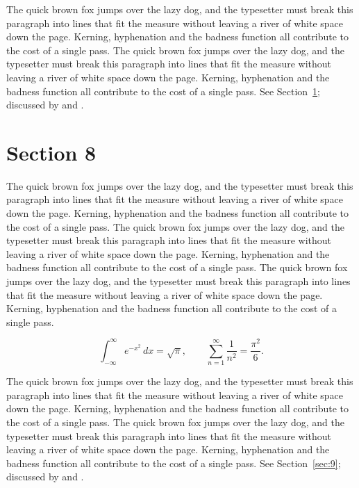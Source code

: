 \documentclass{article}
\begin{document}
The quick brown fox jumps over the lazy dog, and the typesetter must break this paragraph into lines that fit the measure without leaving a river of white space down the page. Kerning, hyphenation and the badness function all contribute to the cost of a single pass. The quick brown fox jumps over the lazy dog, and the typesetter must break this paragraph into lines that fit the measure without leaving a river of white space down the page. Kerning, hyphenation and the badness function all contribute to the cost of a single pass. 
See Section~\ref{sec:8}; discussed by \textcite{k3} and \textcite{l5}.
\section{Section 8}
\label{sec:8}
The quick brown fox jumps over the lazy dog, and the typesetter must break this paragraph into lines that fit the measure without leaving a river of white space down the page. Kerning, hyphenation and the badness function all contribute to the cost of a single pass. The quick brown fox jumps over the lazy dog, and the typesetter must break this paragraph into lines that fit the measure without leaving a river of white space down the page. Kerning, hyphenation and the badness function all contribute to the cost of a single pass. The quick brown fox jumps over the lazy dog, and the typesetter must break this paragraph into lines that fit the measure without leaving a river of white space down the page. Kerning, hyphenation and the badness function all contribute to the cost of a single pass. 

\begin{equation}\label{eq:8}
\int_{-\infty}^{\infty} e^{-x^{2}}\,dx = \sqrt{\pi}, \qquad
\sum_{n=1}^{\infty} \frac{1}{n^{2}} = \frac{\pi^{2}}{6}.
\end{equation}

The quick brown fox jumps over the lazy dog, and the typesetter must break this paragraph into lines that fit the measure without leaving a river of white space down the page. Kerning, hyphenation and the badness function all contribute to the cost of a single pass. The quick brown fox jumps over the lazy dog, and the typesetter must break this paragraph into lines that fit the measure without leaving a river of white space down the page. Kerning, hyphenation and the badness function all contribute to the cost of a single pass. 
See Section~\ref{sec:9}; discussed by \textcite{k4} and \textcite{l1}.
\end{document}

